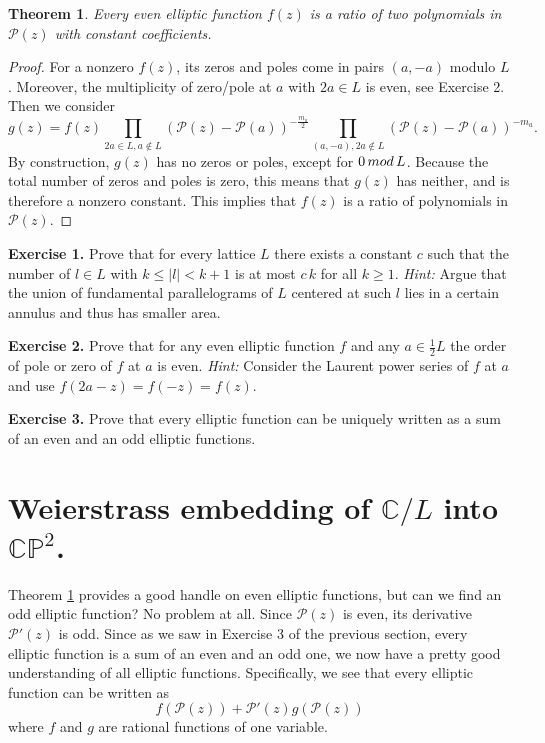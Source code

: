 \documentclass[11pt]{article}
\numberwithin{equation}{section}
\numberwithin{footnote}{section}
\newtheorem{thm}{Theorem}[section]
\renewcommand{\P}{{\mathbb P}}
\newcommand{\C}{{\mathbb C}}
\begin{document}
\begin{thm}\label{evenelliptic}
Every even elliptic function $f(z)$ is a ratio of two polynomials in $\mathcal P(z)$ with constant coefficients.
\end{thm}

\begin{proof}
For a nonzero $f(z)$, its zeros and poles come in pairs $(a,-a)$ modulo $L$. Moreover, the multiplicity of zero/pole at $a$ with $2a\in L$ is even, see Exercise 2.
Then we consider 
$$
g(z) = f(z)  \prod_{2a\in L,a\not\in L} (\mathcal P(z) -\mathcal P(a))^{-\frac{m_a}2}
\prod_{(a,-a),2a\not\in L} (\mathcal P(z) -\mathcal P(a))^{-m_a}.
$$
By construction, $g(z)$ has no zeros or poles, except for $0\,{\rm mod}\,L$. Because the total number of zeros and poles is zero, this means that $g(z)$ has neither, and is therefore a nonzero constant. This implies that $f(z)$ is a ratio of polynomials in $\mathcal P(z)$. 
\end{proof}

{\bf Exercise 1.} Prove that for every lattice $L$ there exists a constant $c$ such that the number of $l\in L$ with 
$k\leq |l|< k+1$ is at most $c\, k$ for all $k\geq 1$. \emph{Hint:} Argue that the union of fundamental parallelograms of $L$ centered at such $l$ lies in a certain annulus and thus has smaller area.

{\bf Exercise 2.} Prove that for any even elliptic function $f$ and any $a\in \frac 12 L$ the order of pole or zero of $f$ at $a$ is even.
\emph{Hint:} Consider the Laurent power series of $f$ at $a$ and use $f(2a-z) = f(-z)=f(z)$.

{\bf Exercise 3.} Prove that every elliptic function can be uniquely written as a sum of an even and an odd elliptic functions.



\section{Weierstrass embedding of $\C/L$ into $\C\P^2$.}
Theorem \ref{evenelliptic} provides a good handle on even elliptic functions, but can we find an odd elliptic function? No problem at all. 
Since $\mathcal P(z)$ is even, its derivative $\mathcal P'(z)$ is odd. Since as we saw in Exercise 3 of the previous section, every elliptic function is a sum of an even and an odd one, we now have a pretty good understanding of all elliptic functions. Specifically, we see that every elliptic function can be written as 
$$
f(\mathcal P(z)) + \mathcal P'(z) g(\mathcal P(z))
$$
where $f$ and $g$ are rational functions of one variable.
\end{document}
